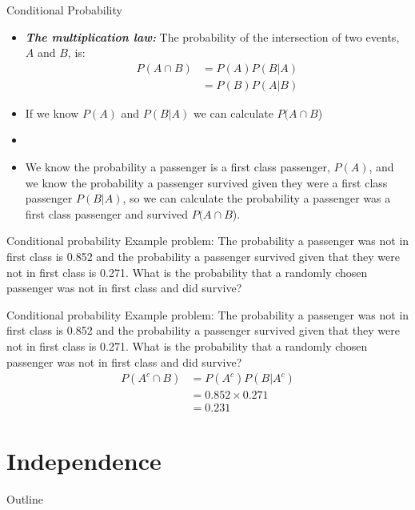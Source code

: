 \documentclass[xcolor=dvipsnames]{beamer}
\begin{document}
\begin{frame}{Conditional Probability}
	\begin{itemize}
		\item \textbf{\emph{The multiplication law:}} The probability of the intersection of two events, $A$ and $B$, is:
		\begin{align*}
		P(A \cap B) &= P(A) P(B|A) \\
		&= P(B)P(A|B)
		\end{align*}
		\item If we know $P(A)$ and $P(B|A)$ we can calculate $P(A \cap B$)
		\item[]
		\item We know the probability a passenger is a first class passenger, $P(A)$, and we know the probability a passenger survived given they were a first class passenger $P(B|A)$, so we can calculate the probability a passenger was a first class passenger and survived $P(A \cap B$).
	\end{itemize}
\end{frame}

\begin{frame}{Conditional probability}
Example problem: The probability a passenger was not in first class is 0.852 and the probability a passenger survived given that they were not in first class is 0.271. What is the probability that a randomly chosen passenger was not in first class and did survive?
\end{frame}

\begin{frame}{Conditional probability}
	Example problem: The probability a passenger was not in first class is 0.852 and the probability a passenger survived given that they were not in first class is 0.271. What is the probability that a randomly chosen passenger was not in first class and did survive?
	\begin{align*}
		P(A^c \cap B) &= P(A^c) P(B|A^c) \\
		&= 0.852 \times 0.271 \\
		&= 0.231
	\end{align*}
\end{frame}

\section{Independence}
\begin{frame}{Outline}
\tableofcontents[currentsection,subsectionstyle=show/shaded/hide]
\end{frame}
\end{document}
